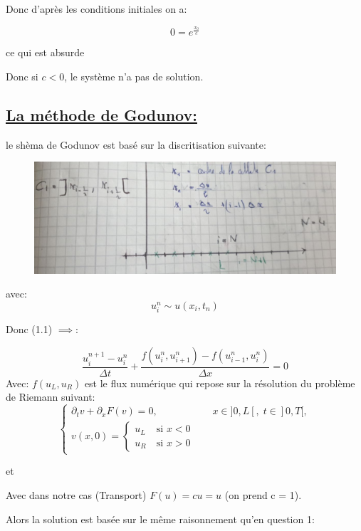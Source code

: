Donc d'apr\`es les conditions initiales on a:

 $$0=e^{\frac{x_0}{c}}$$
 
ce qui est absurde

Donc si $c<0$, le syst\`eme n'a pas de solution. 


\subsection[La m\'ethode de Godunov]{\uline{La m\'ethode de Godunov:}}
le sh\`ema de Godunov est bas\'e sur la discritisation suivante:

\begin{figure}[h!]
	\centering \includegraphics[scale=0.25]{Images_Fichiers/Y5.png}
\end{figure}
avec:
$$u_i^n \sim u(x_i,t_n)$$

Donc (1.1) $\implies$:

$$ \frac {u_i^{n+1} -u_i^n}{\Delta t} + \frac {f(u_{i}^{n},u_{i+1}^{n}) - f(u_{i-1}^{n},u_{i}^{n})}{\Delta x} = 0$$ 
Avec:
$f(u_L, u_R)$ est le flux num\'erique qui repose sur la r\'esolution du probl\`eme de Riemann suivant:
\begin{equation}
\left \lbrace \begin{array}{rl}
\partial_t v +  \partial_x F(v)= 0, & \quad x \in ]0,L[, \; t \in ]0,T[, \\
v(x,0) =
\left \lbrace \begin{array}{rl}
u_L & ~\text{si }  x < 0\\
u_R & ~\text{si }  x>0
\end{array}\right.
\end{array}\right.
\end{equation}

et 

Avec dans notre cas (Transport) $F(u) = cu = u$ (on prend c = 1).

Alors la solution est bas\'ee sur le m\^eme raisonnement qu'en question 1:

